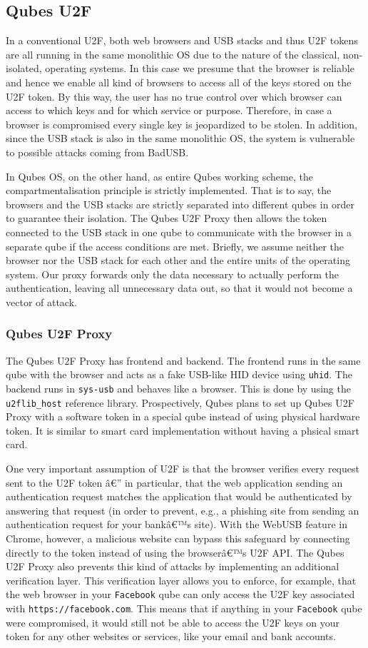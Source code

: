 \documentclass[runningheads,a4paper]{article}
\begin{document}
\subsection{Qubes U2F}
In a conventional U2F, both web browsers and USB stacks and thus U2F tokens are all running in the same monolithic OS due to the nature of the classical, non-isolated, operating systems. In this case we presume that the browser is reliable and hence we enable all kind of browsers to access all of the keys stored on the U2F token. By this way, the user has no true control over which browser can access to which keys and for which service or purpose. Therefore, in case a browser is compromised every single key is jeopardized to be stolen. In addition, since the USB stack is also in the same monolithic OS, the system is vulnerable to possible attacks coming from BadUSB.

In Qubes OS, on the other hand, as entire Qubes working scheme, the compartmentalisation principle is strictly implemented. That is to say, the browsers and the USB stacks are strictly separated into different qubes in order to guarantee their isolation.  The Qubes U2F Proxy then allows the token connected to the USB stack in one qube to communicate with the browser in a separate qube if the access conditions are met. Briefly, we assume neither the browser nor the USB stack for each other and the entire units of the operating system. Our proxy forwards only the data necessary to actually perform the authentication, leaving all unnecessary data out, so that it would not  become a vector of attack.
\subsubsection{Qubes U2F Proxy}
The Qubes U2F Proxy has frontend and backend. The frontend runs in the same qube with the browser and acts as a fake USB-like HID device using \texttt{uhid}. The backend runs in \texttt{sys-usb} and behaves like a browser. This is done by using the \texttt{u2flib\_host} reference library. Prospectively, Qubes plans to set up Qubes U2F Proxy with a software token in a special qube instead of using physical hardware token. It is similar to smart card implementation without having a phsical smart card.

One very important assumption of U2F is that the browser verifies every request sent to the U2F token â€” in particular, that the web application sending an authentication request matches the application that would be authenticated by answering that request (in order to prevent, e.g., a phishing site from sending an authentication request for your bankâ€™s site). With the WebUSB feature in Chrome, however, a malicious website can bypass this safeguard by connecting directly to the token instead of using the browserâ€™s U2F API.
The Qubes U2F Proxy also prevents this kind of attacks by implementing an additional verification layer. This verification layer allows you to enforce, for example, that the web browser in your \texttt{Facebook} qube can only access the U2F key associated with \texttt{https://facebook.com}. This means that if anything in your  \texttt{Facebook} qube were compromised, it would still not be able to access the U2F keys on your token for any other websites or services, like your email and bank accounts. 
\end{document}
